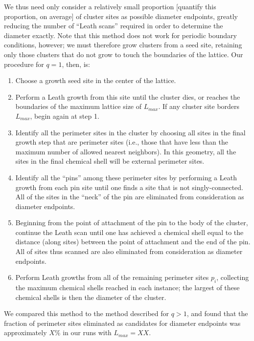 \documentclass[pre,preprint,11pt]{revtex4}
\begin{document}
We thus need only consider a relatively small proportion [quantify this proportion, on average] of cluster sites as possible diameter endpoints, greatly reducing the number of ``Leath scans'' required in order to determine the diameter exactly.  Note that this method does not work for periodic boundary conditions, however; we must therefore grow clusters from a seed site, retaining only those clusters that do not grow to touch the boundaries of the lattice. Our procedure for $q=1$, then, is:

\begin {enumerate}
\item Choose a growth seed site in the center of the lattice.
\item Perform a Leath growth from this site until the cluster dies, or reaches the boundaries of the maximum lattice size of $L_{max}$. If any cluster site borders $L_{max}$, begin again at step 1.
\item Identify all the perimeter sites in the cluster by choosing all sites in the final growth step that are perimeter sites (i.e., those that have less than the maximum number of allowed nearest neighbors).  In this geometry, all the sites in the final chemical shell will be external perimeter sites.
\item Identify all the ``pins'' among these perimeter sites by performing a Leath growth from each pin site until one finds a site that is not singly-connected.  All of the sites in the ``neck'' of the pin are eliminated from consideration as diameter endpoints.
\item Beginning from the point of attachment of the pin to the body of the cluster, continue the Leath scan until one has achieved a chemical shell equal to the distance (along sites) between the point of attachment and the end of the pin.  All of sites thus scanned are also eliminated from consideration as diameter endpoints.
\item Perform Leath growths from all of the remaining perimeter sites $p_i$, collecting the maximum chemical shells reached in each instance; the largest of these chemical shells is then the diameter of the cluster.
\end {enumerate}

We compared this method to the method described for $q>1$, and found that the fraction of perimeter sites eliminated as candidates for diameter endpoints was approximately $X\%$ in our runs with $L_{max}=XX$.

\end{document}
